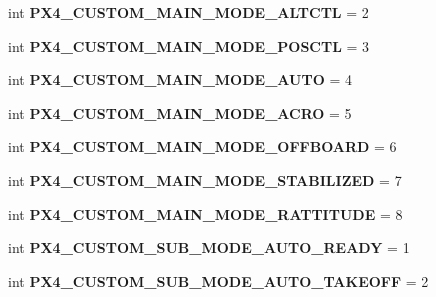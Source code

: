 \begin{DoxyCompactItemize}
int {\bfseries P\+X4\+\_\+\+C\+U\+S\+T\+O\+M\+\_\+\+M\+A\+I\+N\+\_\+\+M\+O\+D\+E\+\_\+\+A\+L\+T\+C\+TL} = 2
\item 
\mbox{\label{namespacepymavlink_1_1mavutil_a0a679fe2d2967f3271f9232fc014ba1c}} 
int {\bfseries P\+X4\+\_\+\+C\+U\+S\+T\+O\+M\+\_\+\+M\+A\+I\+N\+\_\+\+M\+O\+D\+E\+\_\+\+P\+O\+S\+C\+TL} = 3
\item 
\mbox{\label{namespacepymavlink_1_1mavutil_ae22642fa49006aedb8286cb4583dce00}} 
int {\bfseries P\+X4\+\_\+\+C\+U\+S\+T\+O\+M\+\_\+\+M\+A\+I\+N\+\_\+\+M\+O\+D\+E\+\_\+\+A\+U\+TO} = 4
\item 
\mbox{\label{namespacepymavlink_1_1mavutil_a33881ab88c8163d6242a7f7e6e6dbfc0}} 
int {\bfseries P\+X4\+\_\+\+C\+U\+S\+T\+O\+M\+\_\+\+M\+A\+I\+N\+\_\+\+M\+O\+D\+E\+\_\+\+A\+C\+RO} = 5
\item 
\mbox{\label{namespacepymavlink_1_1mavutil_aea53f0d5955fbf2e82015f41e617d9b7}} 
int {\bfseries P\+X4\+\_\+\+C\+U\+S\+T\+O\+M\+\_\+\+M\+A\+I\+N\+\_\+\+M\+O\+D\+E\+\_\+\+O\+F\+F\+B\+O\+A\+RD} = 6
\item 
\mbox{\label{namespacepymavlink_1_1mavutil_a756f7e47118fb1df232efdd6b2e7adb6}} 
int {\bfseries P\+X4\+\_\+\+C\+U\+S\+T\+O\+M\+\_\+\+M\+A\+I\+N\+\_\+\+M\+O\+D\+E\+\_\+\+S\+T\+A\+B\+I\+L\+I\+Z\+ED} = 7
\item 
\mbox{\label{namespacepymavlink_1_1mavutil_a00da773da139cae86817889b24b157c2}} 
int {\bfseries P\+X4\+\_\+\+C\+U\+S\+T\+O\+M\+\_\+\+M\+A\+I\+N\+\_\+\+M\+O\+D\+E\+\_\+\+R\+A\+T\+T\+I\+T\+U\+DE} = 8
\item 
\mbox{\label{namespacepymavlink_1_1mavutil_a337a3187e21fd6434db84f90d30827ae}} 
int {\bfseries P\+X4\+\_\+\+C\+U\+S\+T\+O\+M\+\_\+\+S\+U\+B\+\_\+\+M\+O\+D\+E\+\_\+\+A\+U\+T\+O\+\_\+\+R\+E\+A\+DY} = 1
\item 
\mbox{\label{namespacepymavlink_1_1mavutil_ae9338639eb06f8f785625c6ee23262ef}} 
int {\bfseries P\+X4\+\_\+\+C\+U\+S\+T\+O\+M\+\_\+\+S\+U\+B\+\_\+\+M\+O\+D\+E\+\_\+\+A\+U\+T\+O\+\_\+\+T\+A\+K\+E\+O\+FF} = 2

\end{DoxyCompactItemize}
